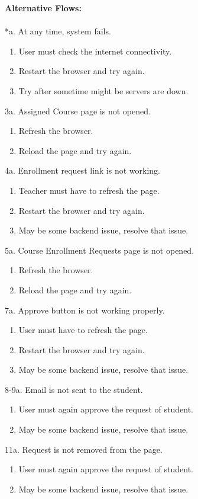 \documentclass[12pt]{article}
\begin{document}
\textbf{Alternative Flows:}\\
\\
*a. At any time, system fails.
\begin{enumerate}
\item User must check the internet connectivity.
\item Restart the browser and try again.
\item Try after sometime might be servers are down.
\end{enumerate}
3a. Assigned Course page is not opened.
\begin{enumerate}
\item Refresh the browser.
\item Reload the page and try again.
\end{enumerate}
4a. Enrollment request link is not working.
\begin{enumerate}
\item Teacher must have to refresh the page.
\item Restart the browser and try again.
\item May be some backend issue, resolve that issue.
\end{enumerate}
\newpage
5a. Course Enrollment Requests page is not opened.
\begin{enumerate}
\item Refresh the browser.
\item Reload the page and try again.
\end{enumerate}
7a. Approve button is not working properly.
\begin{enumerate}
\item User must have to refresh the page.
\item Restart the browser and try again.
\item May be some backend issue, resolve that issue.
\end{enumerate}
8-9a. Email is not sent to the student.
\begin{enumerate}
\item User must again approve the request of student.
\item May be some backend issue, resolve that issue.
\end{enumerate}
11a. Request is not removed from the page.
\begin{enumerate}
\item User must again approve the request of student.
\item May be some backend issue, resolve that issue.
\end{enumerate}
\end{document}
